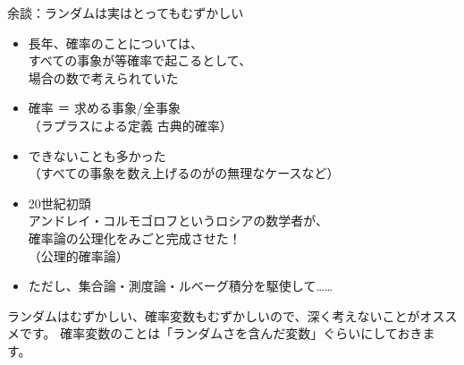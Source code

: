 \documentclass[dvipdfmx,cjk]{beamer}
\begin{document}
\begin{frame}{余談：ランダムは実はとってもむずかしい} \pause


\begin{itemize}
    \item 長年、確率のことについては、\\
    すべての事象が等確率で起こるとして、\\
    場合の数で考えられていた \pause
    \item 確率 ＝ 求める事象/全事象 \\
    （ラプラスによる定義 古典的確率） \pause
    \item できないことも多かった \\
    （すべての事象を数え上げるのがの無理なケースなど） \pause

    \item 20世紀初頭 \\ \pause
    アンドレイ・コルモゴロフというロシアの数学者が、 \\
    確率論の公理化をみごと完成させた！\\
    （公理的確率論） \pause

    \item ただし、集合論・測度論・ルベーグ積分を駆使して……  \pause
\end{itemize}





\vskip 0.3cm

ランダムはむずかしい、確率変数もむずかしいので、深く考えないことがオススメです。
確率変数のことは「ランダムさを含んだ変数」ぐらいにしておきます。


\end{frame}
\end{document}
